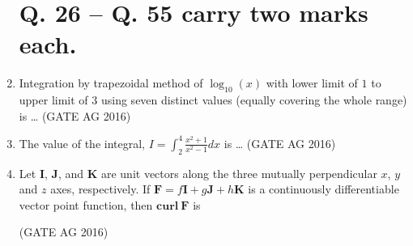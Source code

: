 \documentclass[journal]{IEEEtran}
\begin{document}
\begin{enumerate}
\medskip

\section*{Q. 26 -- Q. 55 carry two marks each.}

\item 
Integration by trapezoidal method of $\log_{10}(x)$ with lower limit of $1$ to upper limit of $3$ using seven distinct values (equally covering the whole range) is \dots
\hfill(GATE AG 2016)\\

\medskip

\item 
The value of the integral, $I = \int_{2}^{4} \frac{x^2+1}{x^2-1}dx$ is \dots
\hfill(GATE AG 2016)\\

\medskip

\item 
Let $\mathbf{I}$, $\mathbf{J}$, and $\mathbf{K}$ are unit vectors along the three mutually perpendicular $x$, $y$ and $z$ axes, respectively. If $\mathbf{F} = f\mathbf{I} + g\mathbf{J} + h\mathbf{K}$ is a continuously differentiable vector point function, then $\mathbf{curl\ F}$ is
\begin{enumerate}
\end{enumerate}
\hfill(GATE AG 2016)\\


\end{enumerate}
\end{document}
